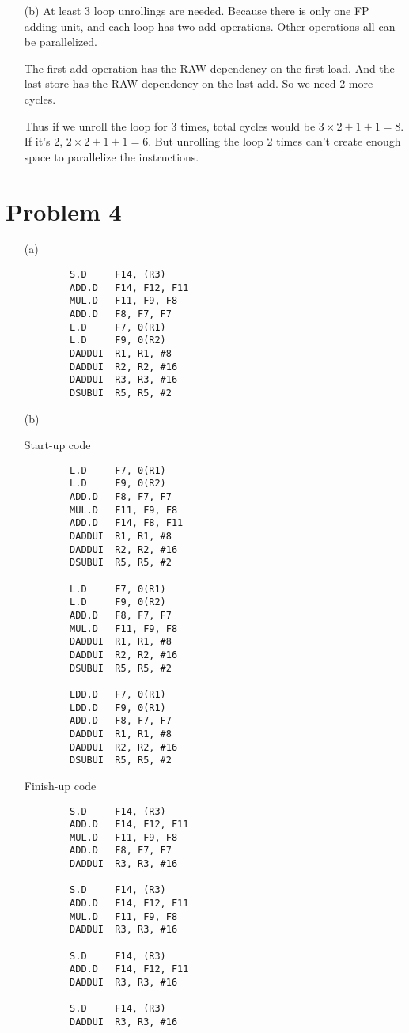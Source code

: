 \documentclass[11pt,leqno]{article}
\begin{document}
\begin{enumerate}
{\begin{tabular}{|l|l|l|l|l|}
\end{tabular}
}
\item[(b)]
At least 3 loop unrollings are needed. Because there is only one FP adding unit, and each loop has two add operations. Other operations all can be parallelized. 

The first add operation has the RAW dependency on the first load. And the last store has the RAW dependency on the last add. So we need 2 more cycles. 

Thus if we unroll the loop for 3 times, total cycles would be $3\times 2 + 1 + 1 = 8$. If it's 2, $2\times 2 + 1 + 1 = 6$. But unrolling the loop 2 times can't create enough space to parallelize the instructions. 


\end{enumerate}
\section*{Problem 4}

\begin{enumerate}
\item[(a)] 
{\small
\begin{verbatim}
        S.D     F14, (R3)
        ADD.D   F14, F12, F11
        MUL.D   F11, F9, F8
        ADD.D   F8, F7, F7
        L.D     F7, 0(R1)
        L.D     F9, 0(R2)
        DADDUI  R1, R1, #8
        DADDUI  R2, R2, #16
        DADDUI  R3, R3, #16
        DSUBUI  R5, R5, #2
\end{verbatim}
}
\item[(b)]

Start-up code
{\small
\begin{verbatim}
        L.D     F7, 0(R1)
        L.D     F9, 0(R2)
        ADD.D   F8, F7, F7
        MUL.D   F11, F9, F8
        ADD.D   F14, F8, F11
        DADDUI  R1, R1, #8
        DADDUI  R2, R2, #16
        DSUBUI  R5, R5, #2

        L.D     F7, 0(R1)
        L.D     F9, 0(R2)
        ADD.D   F8, F7, F7
        MUL.D   F11, F9, F8
        DADDUI  R1, R1, #8
        DADDUI  R2, R2, #16
        DSUBUI  R5, R5, #2

        LDD.D   F7, 0(R1)
        LDD.D   F9, 0(R1)
        ADD.D   F8, F7, F7
        DADDUI  R1, R1, #8
        DADDUI  R2, R2, #16
        DSUBUI  R5, R5, #2
\end{verbatim}
}
Finish-up code
{\small
\begin{verbatim}
        S.D     F14, (R3)
        ADD.D   F14, F12, F11
        MUL.D   F11, F9, F8
        ADD.D   F8, F7, F7
        DADDUI  R3, R3, #16

        S.D     F14, (R3)
        ADD.D   F14, F12, F11
        MUL.D   F11, F9, F8
        DADDUI  R3, R3, #16

        S.D     F14, (R3)
        ADD.D   F14, F12, F11
        DADDUI  R3, R3, #16

        S.D     F14, (R3)
        DADDUI  R3, R3, #16
\end{verbatim}
}
\end{enumerate}
\end{document}
